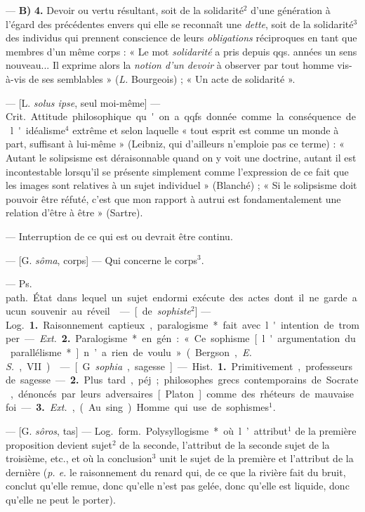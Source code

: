 \begin{itemize}[leftmargin=1cm, label=, itemsep=1pt]
— {\bf B)}  {\bf 4.} Devoir ou vertu résultant, soit de la
solidarité$^2$ d’une génération à l'égard des précédentes envers qui elle se
reconnaît une {\it dette}, soit de la solidarité$^3$ des individus qui
prennent conscience de leurs {\it obligations} réciproques en tant que
membres d’un même corps : « Le mot {\it solidarité} a pris depuis qqs. années
un sens nouveau... Il exprime alors la {\it notion d’un devoir} à observer
par tout homme vis-à-vis de ses semblables » ({\it L.} Bourgeois) ; « Un acte
de solidarité ».

 — [L. {\it solus ipse}, seul moi-même] — \si{Crit.} Attitude
philosophique qu'on a qqfs. donnée comme la conséquence de l'idéalisme$^4$
extrême et selon laquelle « tout esprit est comme un monde à part, suffisant
à lui-même » (Leibniz, qui d’ailleurs n’emploie pas ce terme) : « Autant le
solipsisme est déraisonnable quand on y voit une doctrine, autant il est
incontestable lorsqu'il se présente simplement comme l'expression de ce fait
que les images sont relatives à un sujet individuel » (Blanché) ; « Si le
solipsisme doit pouvoir être réfuté, c'est que mon rapport à autrui est
fondamentalement une relation d’être à être » (Sartre).

 — Interruption
de ce qui est ou devrait être continu.

 — [G. {\it sôma}, corps] — Qui concerne le corps$^3$.

 — \si{Ps. path.} État dans lequel un sujet endormi exécute
des actes dont il ne garde aucun souvenir au réveil.

 — [de {\it sophiste}$^2$] — \si{Log.} {\bf 1.} Raisonnement
captieux, paralogisme*
fait avec l'intention de tromper. — {\it Ext.} {\bf 2.} Paralogisme* en
gén. : « Ce sophisme [l'argumentation du parallélisme*] n’a rien de voulu
» (Bergson, {\it E. S.}, VII).

 — [G. {\it sophia}, sagesse] — \si{Hist.} {\bf 1.} Primitivement,
professeurs de sagesse. — {\bf 2.} Plus tard., péj. ; philosophes grecs
contemporains de Socrate, dénoncés par leurs adversaires [Platon] comme des
rhéteurs de mauvaise foi. — {\bf 3.} {\it Ext.}, (Au sing.) Homme qui use de
sophismes$^1$.

 — [G. {\it sôros}, tas] — \si{Log.} \si{form.} Polysyllogisme* où
l’attribut$^1$ de la première proposition devient sujet$^2$ de la seconde,
l’attribut de la seconde sujet de la troisième, etc., et où la conclusion$^3$
unit le sujet de la première et l’attribut de la dernière ({\it p. e.} le
raisonnement du renard qui, de ce que la rivière fait du bruit, conclut
qu’elle remue, donc qu’elle n’est pas gelée, donc qu’elle est liquide, donc
qu'elle ne peut le porter).


\end{itemize}
